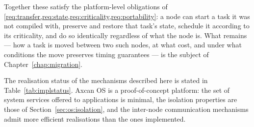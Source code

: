 Together these satisfy the platform-level obligations of
\cref{req:transfer,req:state,req:criticality,req:portability}: a node can
start a task it was not compiled with, preserve and restore that task's state,
schedule it according to its criticality, and do so identically regardless of
what the node is. What remains --- how a task is moved between two such nodes,
at what cost, and under what conditions the move preserves timing guarantees
--- is the subject of Chapter~\ref{chap:migration}.

The realisation status of the mechanisms described here is stated in
Table~\ref{tab:implstatus}. Axcan OS is a proof-of-concept platform: the set
of system services offered to applications is minimal, the isolation
properties are those of Section~\ref{sec:os:isolation}, and the inter-node
communication mechanisms admit more efficient realisations than the ones
implemented.
